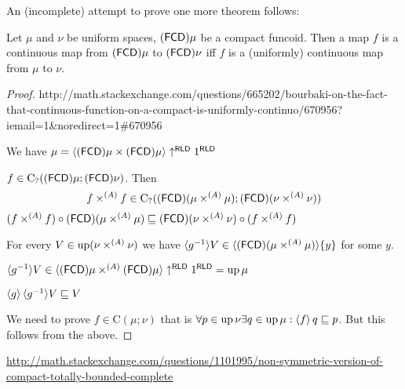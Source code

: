 An (incomplete) attempt to prove one more theorem follows:

\begin{thm}
  Let $\mu$ and $\nu$ be uniform spaces, $(\mathsf{FCD})
  \mu$ be a compact funcoid. Then a map $f$ is a continuous map from
  $(\mathsf{FCD}) \mu$ to $(\mathsf{FCD}) \nu$ iff $f$ is
  a (uniformly) continuous map from $\mu$ to $\nu$.
\end{thm}

\begin{proof}

http://math.stackexchange.com/questions/665202/bourbaki-on-the-fact-that-continuous-function-on-a-compact-is-uniformly-continuo/670956?iemail=1\&noredirect=1\#670956

We have $\mu= \langle (\mathsf{FCD}) \mu \times
(\mathsf{FCD}) \mu \rangle \uparrow^{\mathsf{RLD}} 1^{\mathsf{RLD}}$

$f \in \mathrm{C}_? ((\mathsf{FCD}) \mu; (\mathsf{FCD})
\nu)$. Then
\[ f \times^{(A)} f \in \mathrm{C}_? ((\mathsf{FCD}) (\mu \times^{(A)}
   \mu) ; (\mathsf{FCD}) (\nu \times^{(A)} \nu)) \]
$(f \times^{(A)} f) \circ (\mathsf{FCD}) (\mu \times^{(A)} \mu)
\sqsubseteq (\mathsf{FCD}) (\nu \times^{(A)} \nu) \circ (f \times^{(A)} f)$

For every $V \in \operatorname{up} (\nu \times^{(A)} \nu)$ we have $\langle g^{- 1} \rangle
V \in \langle (\mathsf{FCD}) (\mu \times^{(A)} \mu) \rangle
\{ y \}$ for some $y$.

$\langle g^{- 1} \rangle V \in \langle (\mathsf{FCD}) \mu \times^{(A)}
(\mathsf{FCD}) \mu \rangle \uparrow^{\mathsf{RLD}} 1^{\mathsf{RLD}}
= \operatorname{up} \mu$

$\left\langle g\right\rangle \langle g^{- 1} \rangle V \sqsubseteq V$

We need to prove $f \in \mathrm{C} (\mu; \nu)$ that is $\forall p \in
\operatorname{up} \nu \exists q \in \operatorname{up} \mu: \left\langle f\right\rangle q
\sqsubseteq p$. But this follows from the above.
\end{proof}


\url{http://math.stackexchange.com/questions/1101995/non-symmetric-version-of-compact-totally-bounded-complete}
